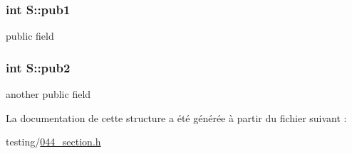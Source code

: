 \subsubsection[{pub1}]{\setlength{\rightskip}{0pt plus 5cm}int S\+::pub1}\label{struct_s_aff6062601582dff52ace76d285c2e504}
public field \hypertarget{struct_s_a413054db7785010db38c16322c8583cc}{}
\subsubsection[{pub2}]{\setlength{\rightskip}{0pt plus 5cm}int S\+::pub2}\label{struct_s_a413054db7785010db38c16322c8583cc}
another public field 

La documentation de cette structure a été générée à partir du fichier suivant \+:\begin{DoxyCompactItemize}
\item 
testing/\hyperlink{044__section_8h}{044\+\_\+section.\+h}\end{DoxyCompactItemize}
